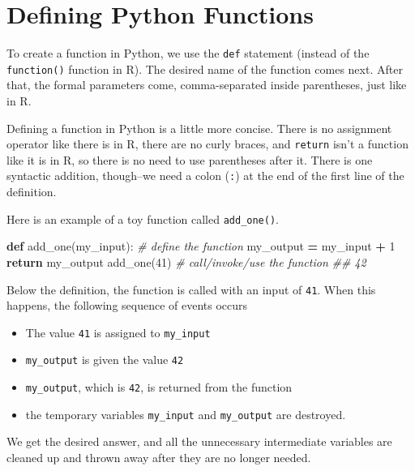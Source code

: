 \documentclass[
  12pt,
  krantz2]{krantz}
\makeatletter
\newenvironment{Shaded}{\begin{snugshade}}{\end{snugshade}}
\newcommand{\CommentTok}[1]{\textcolor[rgb]{0.37,0.37,0.37}{\textit{#1}}}
\newcommand{\ControlFlowTok}[1]{\textcolor[rgb]{0.27,0.27,0.27}{\textbf{#1}}}
\newcommand{\DecValTok}[1]{\textcolor[rgb]{0.06,0.06,0.06}{#1}}
\newcommand{\KeywordTok}[1]{\textcolor[rgb]{0.27,0.27,0.27}{\textbf{#1}}}
\newcommand{\NormalTok}[1]{#1}
\newcommand{\OperatorTok}[1]{\textcolor[rgb]{0.43,0.43,0.43}{\textbf{#1}}}
\providecommand{\tightlist}{%
  \setlength{\itemsep}{0pt}\setlength{\parskip}{0pt}}
\newenvironment{kframe}{%
\medskip{}
\setlength{\fboxsep}{.8em}
 \def\at@end@of@kframe{}%
 \ifinner\ifhmode%
  \def\at@end@of@kframe{\end{minipage}}%
  \begin{minipage}{\columnwidth}%
 \fi\fi%
 \def\FrameCommand##1{\hskip\@totalleftmargin \hskip-\fboxsep
 \colorbox{shadecolor}{##1}\hskip-\fboxsep
     \hskip-\linewidth \hskip-\@totalleftmargin \hskip\columnwidth}%
 \MakeFramed {\advance\hsize-\width
   \@totalleftmargin\z@ \linewidth\hsize
   \@setminipage}}%
 {\par\unskip\endMakeFramed%
 \at@end@of@kframe}
\renewenvironment{Shaded}{\begin{kframe}}{\end{kframe}}
\makeatother
\begin{document}
\hypertarget{defining-python-functions}{%
\section{Defining Python Functions}\label{defining-python-functions}}

To create a function in Python, we use the \texttt{def} statement (instead of the \texttt{function()} function in R). The desired name of the function comes next. After that, the formal parameters come, comma-separated inside parentheses, just like in R.

Defining a function in Python is a little more concise. There is no assignment operator like there is in R, there are no curly braces, and \texttt{return} isn't a function like it is in R, so there is no need to use parentheses after it. There is one syntactic addition, though--we need a colon (\texttt{:}) at the end of the first line of the definition.

Here is an example of a toy function called \texttt{add\_one()}.

\begin{Shaded}
\begin{Highlighting}[]
\KeywordTok{def}\NormalTok{ add\_one(my\_input):  }\CommentTok{\# define the function}
\NormalTok{  my\_output }\OperatorTok{=}\NormalTok{ my\_input }\OperatorTok{+} \DecValTok{1}
  \ControlFlowTok{return}\NormalTok{ my\_output}
\NormalTok{add\_one(}\DecValTok{41}\NormalTok{) }\CommentTok{\# call/invoke/use the function }
\CommentTok{\#\# 42}
\end{Highlighting}
\end{Shaded}

Below the definition, the function is called with an input of \texttt{41}. When this happens, the following sequence of events occurs

\begin{itemize}
\tightlist
\item
  The value \texttt{41} is assigned to \texttt{my\_input}
\item
  \texttt{my\_output} is given the value \texttt{42}
\item
  \texttt{my\_output}, which is \texttt{42}, is returned from the function
\item
  the temporary variables \texttt{my\_input} and \texttt{my\_output} are destroyed.
\end{itemize}

We get the desired answer, and all the unnecessary intermediate variables are cleaned up and thrown away after they are no longer needed.
\end{document}
